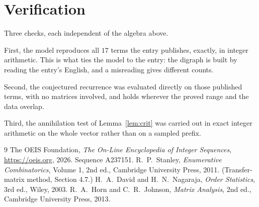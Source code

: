 \documentclass[11pt,a4paper]{article}
\theoremstyle{plain}
\theoremstyle{definition}
\begin{document}
\section{Verification}

Three checks, each independent of the algebra above.

First, the model reproduces all $17$ terms the entry publishes, exactly, in integer
arithmetic. This is what ties the model to the entry: the digraph is built by reading the
entry's English, and a misreading gives different counts.

Second, the conjectured recurrence was evaluated directly on those published terms, with no
matrices involved, and holds wherever the proved range and the data overlap.

Third, the annihilation test of Lemma~\ref{lem:crit} was carried out in exact integer
arithmetic on the whole vector rather than on a sampled prefix.

\begin{thebibliography}{9}
 The OEIS Foundation, \emph{The On-Line Encyclopedia of Integer
Sequences}, \url{https://oeis.org}, 2026. Sequence A237151.
 R.~P.~Stanley, \emph{Enumerative Combinatorics}, Volume 1, 2nd ed.,
Cambridge University Press, 2011. (Transfer-matrix method, Section 4.7.)
 H.~A.~David and H.~N.~Nagaraja, \emph{Order Statistics}, 3rd ed., Wiley,
2003.
 R.~A.~Horn and C.~R.~Johnson, \emph{Matrix Analysis}, 2nd ed., Cambridge
University Press, 2013.
\end{thebibliography}
\end{document}
